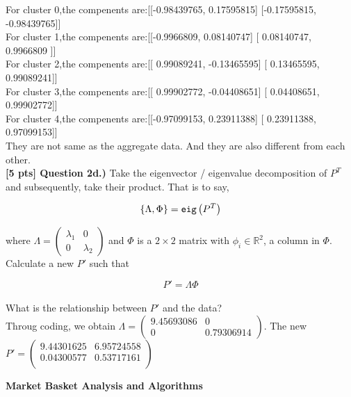 \documentclass[paper=a4, fontsize=11pt]{scrartcl} %
\begin{document}
For cluster 0,the compenents are:[[-0.98439765,  0.17595815]
 [-0.17595815, -0.98439765]]  \\
For cluster 1,the compenents are:[[-0.9966809,   0.08140747]
 [ 0.08140747,  0.9966809 ]]   \\
For cluster 2,the compenents are:[[ 0.99089241, -0.13465595]
 [ 0.13465595,  0.99089241]]   \\
For cluster 3,the compenents are:[[ 0.99902772, -0.04408651]
 [ 0.04408651,  0.99902772]]   \\
For cluster 4,the compenents are:[[-0.97099153,  0.23911388]
 [ 0.23911388,  0.97099153]]   \\

 They are not same as the aggregate data. And they are also different from each other.\\

 
\textbf{[5 pts] Question 2d.)}
Take the eigenvector / eigenvalue decomposition of $P^T$ and subsequently, take their product. That is to say, 

\begin{equation}
    \{\Lambda, \Phi\} = \verb"eig"\left( P^T \right)
    \nonumber
\end{equation}

where $\Lambda = \left( \begin{matrix} \lambda_1 & 0 \\ 0 & \lambda_2 \end{matrix} \right)$ and $\Phi$ is a $2 \times 2$ matrix with $\phi_i \in \mathbb{R}^2$, a column in $\Phi$. Calculate a new $P'$ such that

\begin{equation}
    P' = \Lambda \Phi \nonumber
\end{equation}
\\
What is the relationship between $P'$ and the data? 
\\
Throug coding, we obtain $\Lambda = \left( \begin{matrix} 9.45693086 & 0 \\ 0 & 0.79306914 \end{matrix} \right)$. The new $P'=\left(\begin{matrix}
    9.44301625 & 6.95724558\\
    0.04300577 & 0.53717161 \\
\end{matrix}  \right)$


\vspace{10mm}

{\huge \textbf{Market Basket Analysis and Algorithms}} \\
\end{document}
